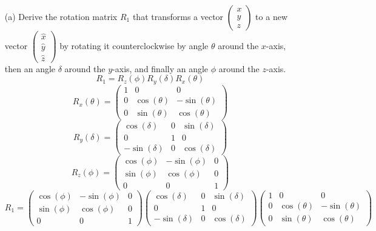 \documentclass[a3paper,12pt]{extarticle} %
\begin{document}
\begin{enumerate}
    \begin{enumerate}
        \item[(a)] Derive the rotation matrix \(R_1\) that transforms a vector \(\begin{pmatrix} x \\ y \\ z \end{pmatrix}\) to a new vector \(\begin{pmatrix} \hat{x} \\ \hat{y} \\ \hat{z} \end{pmatrix}\) by rotating it counterclockwise by angle \(\theta\) around the \(x\)-axis, then an angle \(\delta\) around the \(y\)-axis, and finally an angle \(\phi\) around the \(z\)-axis.
        \[
            R_1 = R_z(\phi)R_y(\delta)R_x(\theta)
        \]
        \[
            R_x(\theta) = \begin{pmatrix} 1 & 0 & 0 \\ 0 & \cos(\theta) & -\sin(\theta) \\ 0 & \sin(\theta) & \cos(\theta) \end{pmatrix}
        \]
        \[
            R_y(\delta) = \begin{pmatrix} \cos(\delta) & 0 & \sin(\delta) \\ 0 & 1 & 0 \\ -\sin(\delta) & 0 & \cos(\delta) \end{pmatrix}
        \]
        \[
            R_z(\phi) = \begin{pmatrix} \cos(\phi) & -\sin(\phi) & 0 \\ \sin(\phi) & \cos(\phi) & 0 \\ 0 & 0 & 1 \end{pmatrix}
        \]
        \[
            R_1 = \begin{pmatrix} \cos(\phi) & -\sin(\phi) & 0 \\ \sin(\phi) & \cos(\phi) & 0 \\ 0 & 0 & 1 \end{pmatrix} \begin{pmatrix} \cos(\delta) & 0 & \sin(\delta) \\ 0 & 1 & 0 \\ -\sin(\delta) & 0 & \cos(\delta) \end{pmatrix} \begin{pmatrix} 1 & 0 & 0 \\ 0 & \cos(\theta) & -\sin(\theta) \\ 0 & \sin(\theta) & \cos(\theta) \end{pmatrix}
\]
\end{enumerate}
\end{enumerate}
\end{document}

